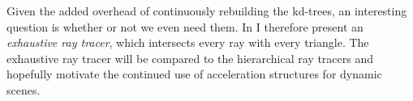 Given the added overhead of continuously rebuilding the kd-trees, an interesting
question is whether or not we even need them. In  I
therefore present an \textit{exhaustive ray tracer}, which intersects every ray
with every triangle. The exhaustive ray tracer will be compared to the
hierarchical ray tracers and hopefully motivate the continued use of
acceleration structures for dynamic scenes.






